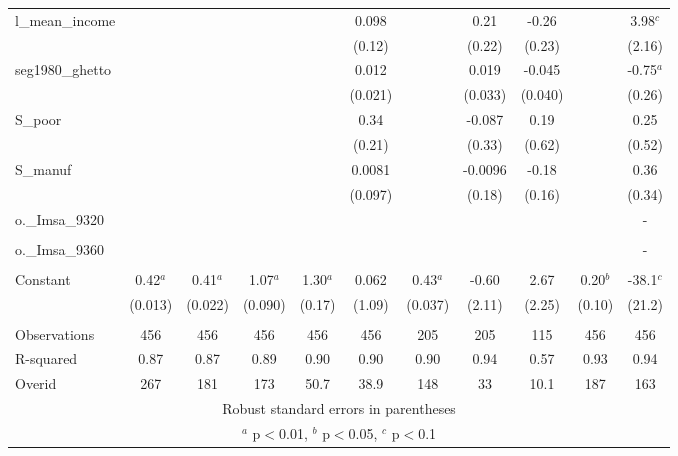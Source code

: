 \documentclass[]{article}
\begin{document}
\begin{tabular}{lcccccccccc}
l\_mean\_income &  &  &  &  & 0.098 &  & 0.21 & -0.26 &  & 3.98$^c$ \\
 &  &  &  &  & (0.12) &  & (0.22) & (0.23) &  & (2.16) \\
seg1980\_ghetto &  &  &  &  & 0.012 &  & 0.019 & -0.045 &  & -0.75$^a$ \\
 &  &  &  &  & (0.021) &  & (0.033) & (0.040) &  & (0.26) \\
S\_poor &  &  &  &  & 0.34 &  & -0.087 & 0.19 &  & 0.25 \\
 &  &  &  &  & (0.21) &  & (0.33) & (0.62) &  & (0.52) \\
S\_manuf &  &  &  &  & 0.0081 &  & -0.0096 & -0.18 &  & 0.36 \\
 &  &  &  &  & (0.097) &  & (0.18) & (0.16) &  & (0.34) \\
o.\_Imsa\_9320 &  &  &  &  &  &  &  &  &  & - \\
 &  &  &  &  &  &  &  &  &  &  \\
o.\_Imsa\_9360 &  &  &  &  &  &  &  &  &  & - \\
 &  &  &  &  &  &  &  &  &  &  \\
Constant & 0.42$^a$ & 0.41$^a$ & 1.07$^a$ & 1.30$^a$ & 0.062 & 0.43$^a$ & -0.60 & 2.67 & 0.20$^b$ & -38.1$^c$ \\
 & (0.013) & (0.022) & (0.090) & (0.17) & (1.09) & (0.037) & (2.11) & (2.25) & (0.10) & (21.2) \\
 &  &  &  &  &  &  &  &  &  &  \\
Observations & 456 & 456 & 456 & 456 & 456 & 205 & 205 & 115 & 456 & 456 \\
R-squared & 0.87 & 0.87 & 0.89 & 0.90 & 0.90 & 0.90 & 0.94 & 0.57 & 0.93 & 0.94 \\
 Overid & 267 & 181 & 173 & 50.7 & 38.9 & 148 & 33 & 10.1 & 187 & 163 \\ \hline
\multicolumn{11}{c}{ Robust standard errors in parentheses} \\
\multicolumn{11}{c}{ $^a$ p$<$0.01, $^b$ p$<$0.05, $^c$ p$<$0.1} \\
\end{tabular}
\end{document}
